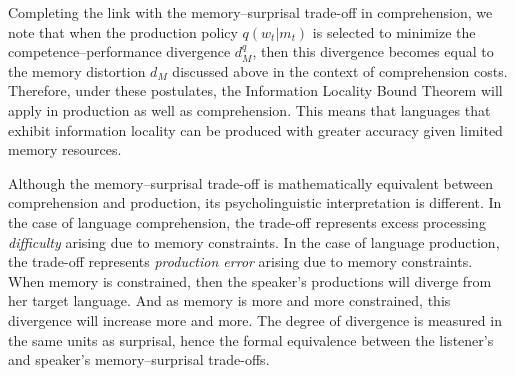 Completing the link with the memory--surprisal trade-off in comprehension, we note that when the production policy $q(w_t|m_t)$ is selected to minimize the competence--performance divergence $d^q_M$, then this divergence becomes equal to the memory distortion $d_M$ discussed above in the context of comprehension costs. Therefore, under these postulates, the Information Locality Bound Theorem will apply in production as well as comprehension. This means that languages that exhibit information locality can be produced with greater accuracy given limited memory resources.

Although the memory--surprisal trade-off is mathematically equivalent between comprehension and production, its psycholinguistic interpretation is different. In the case of language comprehension, the trade-off represents excess processing \emph{difficulty} arising due to memory constraints. In the case of language production, the trade-off represents \emph{production error} arising due to memory constraints. When memory is constrained, then the speaker's productions will diverge from her target language. And as memory is more and more constrained, this divergence will increase more and more. The degree of divergence is measured in the same units as surprisal, hence the formal equivalence between the listener's and speaker's memory--surprisal trade-offs. 































